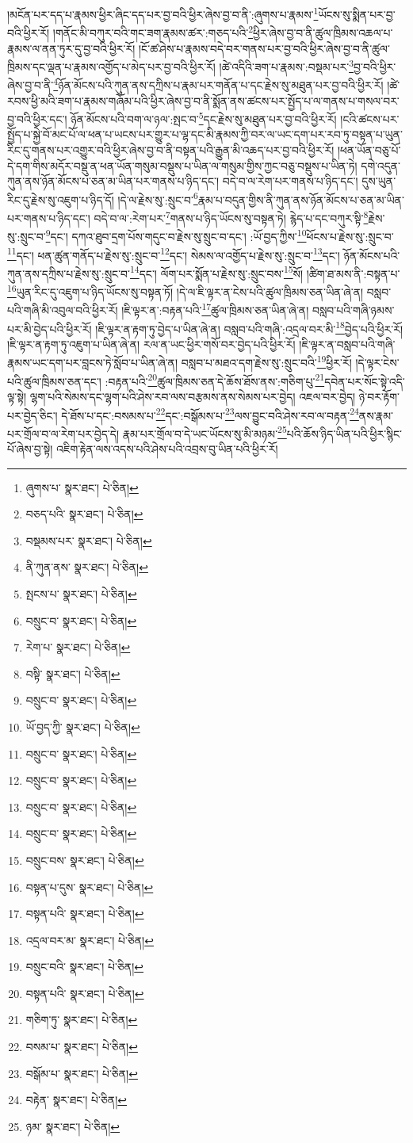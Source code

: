 །མངོན་པར་དད་པ་རྣམས་ཕྱིར་ཞིང་དད་པར་བྱ་བའི་ཕྱིར་ཞེས་བྱ་བ་ནི་:ཞུགས་པ་རྣམས་\footnote{ཞུགས་པ་  སྣར་ཐང་།  པེ་ཅིན། }ཡོངས་སུ་སྨིན་པར་བྱ་བའི་ཕྱིར་རོ། །གནོང་མི་བཀུར་བའི་གང་ཟག་རྣམས་ཚར་:གཅད་པའི་\footnote{བཅད་པའི་  སྣར་ཐང་།  པེ་ཅིན། }ཕྱིར་ཞེས་བྱ་བ་ནི་ཚུལ་ཁྲིམས་འཆལ་པ་རྣམས་ལ་ནན་ཏུར་དུ་བྱ་བའི་ཕྱིར་རོ། །ངོ་ཚ་ཤེས་པ་རྣམས་བདེ་བར་གནས་པར་བྱ་བའི་ཕྱིར་ཞེས་བྱ་བ་ནི་ཚུལ་ཁྲིམས་དང་ལྡན་པ་རྣམས་འགྱོད་པ་མེད་པར་བྱ་བའི་ཕྱིར་རོ། །ཚེ་འདིའི་ཟག་པ་རྣམས་:བསྡམ་པར་\footnote{བསྡམས་པར་  སྣར་ཐང་།  པེ་ཅིན། }བྱ་བའི་ཕྱིར་ཞེས་བྱ་བ་ནི་\footnote{ནི་ཀུན་ནས་  སྣར་ཐང་།  པེ་ཅིན། }ཉོན་མོངས་པའི་ཀུན་ནས་དཀྲིས་པ་རྣམ་པར་གནོན་པ་དང་རྗེས་སུ་མཐུན་པར་བྱ་བའི་ཕྱིར་རོ། །ཚེ་རབས་ཕྱི་མའི་ཟག་པ་རྣམས་གཞོམ་པའི་ཕྱིར་ཞེས་བྱ་བ་ནི་སྨོན་ནས་ཚངས་པར་སྤྱོད་པ་ལ་གནས་པ་གསལ་བར་བྱ་བའི་ཕྱིར་དང་། ཉོན་མོངས་པའི་བག་ལ་ཉལ་:སྤང་བ་\footnote{སྤངས་པ་  སྣར་ཐང་།  པེ་ཅིན། }དང་རྗེས་སུ་མཐུན་པར་བྱ་བའི་ཕྱིར་རོ། །ངའི་ཚངས་པར་སྤྱོད་པ་སྐྱེ་བོ་མང་པོ་ལ་ཕན་པ་ཡངས་པར་གྱུར་པ་ལྷ་དང་མི་རྣམས་ཀྱི་བར་ལ་ཡང་དག་པར་རབ་ཏུ་བསྟན་པ་ཡུན་རིང་དུ་གནས་པར་འགྱུར་བའི་ཕྱིར་ཞེས་བྱ་བ་ནི་བསྟན་པའི་རྒྱུན་མི་འཆད་པར་བྱ་བའི་ཕྱིར་རོ། །ཕན་ཡོན་བཅུ་པོ་དེ་དག་གིས་མདོར་བསྡུ་ན་ཕན་ཡོན་གསུམ་བསྡུས་པ་ཡིན་ལ་གསུམ་གྱིས་ཀྱང་བཅུ་བསྡུས་པ་ཡིན་ཏེ། དགེ་འདུན་ཀུན་ནས་ཉོན་མོངས་པ་ཅན་མ་ཡིན་པར་གནས་པ་ཉིད་དང་། བདེ་བ་ལ་རེག་པར་གནས་པ་ཉིད་དང་། དུས་ཡུན་རིང་དུ་རྗེས་སུ་འཇུག་པ་ཉིད་དོ། །དེ་ལ་རྗེས་སུ་:སྲུང་བ་\footnote{བསྲུང་བ་  སྣར་ཐང་།  པེ་ཅིན། }རྣམ་པ་བདུན་གྱིས་ནི་ཀུན་ནས་ཉོན་མོངས་པ་ཅན་མ་ཡིན་པར་གནས་པ་ཉིད་དང་། བདེ་བ་ལ་:རེག་པར་\footnote{རེག་པ་  སྣར་ཐང་།  པེ་ཅིན། }གནས་པ་ཉིད་ཡོངས་སུ་བསྟན་ཏེ། རྙེད་པ་དང་བཀུར་སྟི་\footnote{བསྟི་  སྣར་ཐང་།  པེ་ཅིན། }རྗེས་སུ་:སྲུང་བ་\footnote{བསྲུང་བ་  སྣར་ཐང་།  པེ་ཅིན། }དང་། དཀའ་ཐུབ་དྲག་པོས་གདུང་བ་རྗེས་སུ་སྲུང་བ་དང་། :ཡོ་བྱད་ཀྱིས་\footnote{ཡོ་བྱད་ཀྱི་  སྣར་ཐང་།  པེ་ཅིན། }ཕོངས་པ་རྗེས་སུ་:སྲུང་བ་\footnote{བསྲུང་བ་  སྣར་ཐང་།  པེ་ཅིན། }དང་། ཕན་ཚུན་གནོད་པ་རྗེས་སུ་:སྲུང་བ་\footnote{བསྲུང་བ་  སྣར་ཐང་།  པེ་ཅིན། }དང་། སེམས་ལ་འགྱོད་པ་རྗེས་སུ་:སྲུང་བ་\footnote{བསྲུང་བ་  སྣར་ཐང་།  པེ་ཅིན། }དང་། ཉོན་མོངས་པའི་ཀུན་ནས་དཀྲིས་པ་རྗེས་སུ་:སྲུང་བ་\footnote{བསྲུང་བ་  སྣར་ཐང་།  པེ་ཅིན། }དང་། ལོག་པར་སྨོན་པ་རྗེས་སུ་:སྲུང་བས་\footnote{བསྲུང་བས་  སྣར་ཐང་།  པེ་ཅིན། }སོ། །ཚིག་ཐ་མས་ནི་:བསྟན་པ་\footnote{བསྟན་པ་དུས་  སྣར་ཐང་།  པེ་ཅིན། }ཡུན་རིང་དུ་འཇུག་པ་ཉིད་ཡོངས་སུ་བསྟན་ཏོ། །དེ་ལ་ཇི་ལྟར་ན་ངེས་པའི་ཚུལ་ཁྲིམས་ཅན་ཡིན་ཞེ་ན། བསླབ་པའི་གཞི་མི་འབུལ་བའི་ཕྱིར་རོ། །ཇི་ལྟར་ན་:བརྟན་པའི་\footnote{བསྟན་པའི་  སྣར་ཐང་།  པེ་ཅིན། }ཚུལ་ཁྲིམས་ཅན་ཡིན་ཞེ་ན། བསླབ་པའི་གཞི་ཉམས་པར་མི་བྱེད་པའི་ཕྱིར་རོ། །ཇི་ལྟར་ན་རྟག་ཏུ་བྱེད་པ་ཡིན་ཞེ་ན། བསླབ་པའི་གཞི་:འདྲལ་བར་མི་\footnote{འདྲལ་བར་མ་  སྣར་ཐང་།  པེ་ཅིན། }བྱེད་པའི་ཕྱིར་རོ། །ཇི་ལྟར་ན་རྟག་ཏུ་འཇུག་པ་ཡིན་ཞེ་ན། རལ་ན་ཡང་ཕྱིར་གསོ་བར་བྱེད་པའི་ཕྱིར་རོ། །ཇི་ལྟར་ན་བསླབ་པའི་གཞི་རྣམས་ཡང་དག་པར་བླངས་ཏེ་སློབ་པ་ཡིན་ཞེ་ན། བསླབ་པ་མཐའ་དག་རྗེས་སུ་:སྲུང་བའི་\footnote{བསྲུང་བའི་  སྣར་ཐང་།  པེ་ཅིན། }ཕྱིར་རོ། །དེ་ལྟར་ངེས་པའི་ཚུལ་ཁྲིམས་ཅན་དང་། :བརྟན་པའི་\footnote{བསྟན་པའི་  སྣར་ཐང་།  པེ་ཅིན། }ཚུལ་ཁྲིམས་ཅན་དེ་ཆོས་ཐོས་ནས་:གཅིག་པུ་\footnote{གཅིག་ཏུ་  སྣར་ཐང་།  པེ་ཅིན། }དབེན་པར་སོང་སྟེ་འདི་ལྟ་སྟེ། ལྷག་པའི་སེམས་དང་ལྷག་པའི་ཤེས་རབ་ལས་བརྩམས་ནས་སེམས་པར་བྱེད། འཇལ་བར་བྱེད། ཉེ་བར་རྟོག་པར་བྱེད་ཅིང་། དེ་ཐོས་པ་དང་:བསམས་པ་\footnote{བསམ་པ་  སྣར་ཐང་།  པེ་ཅིན། }དང་:བསྒོམས་པ་\footnote{བསྒོམ་པ་  སྣར་ཐང་།  པེ་ཅིན། }ལས་བྱུང་བའི་ཤེས་རབ་ལ་བརྟན་\footnote{བརྟེན་  སྣར་ཐང་།  པེ་ཅིན། }ནས་རྣམ་པར་གྲོལ་བ་ལ་རེག་པར་བྱེད་དེ། རྣམ་པར་གྲོལ་བ་དེ་ཡང་ཡོངས་སུ་མི་མཉམ་\footnote{ཉམ་  སྣར་ཐང་།  པེ་ཅིན། }པའི་ཆོས་ཉིད་ཡིན་པའི་ཕྱིར་སྙིང་པོ་ཞེས་བྱ་སྟེ། འཇིག་རྟེན་ལས་འདས་པའི་ཤེས་པའི་འབྲས་བུ་ཡིན་པའི་ཕྱིར་རོ། 